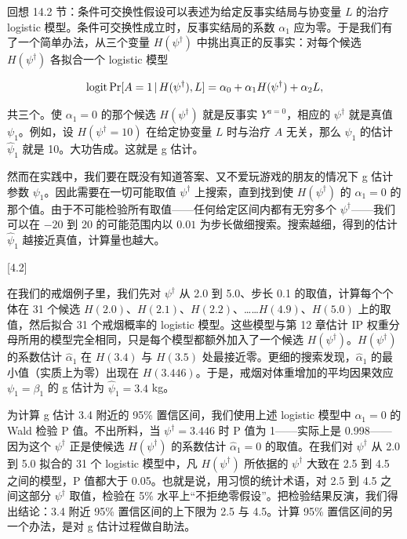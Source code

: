 回想 14.2 节：条件可交换性假设可以表述为给定反事实结局与协变量 $L$ 的治疗 logistic 模型。条件可交换性成立时，反事实结局的系数 $\alpha_1$ 应为零。于是我们有了一个简单办法，从三个变量 $H(\psi^\dagger)$ 中挑出真正的反事实：对每个候选 $H(\psi^\dagger)$ 各拟合一个 logistic 模型

\[
\operatorname{logit}\Pr[A=1\,|\, H(\psi^\dagger),L]=\alpha_0+\alpha_1H(\psi^\dagger)+\alpha_2L,
\]

共三个。使 $\alpha_1=0$ 的那个候选 $H(\psi^\dagger)$ 就是反事实 $Y^{a=0}$，相应的 $\psi^\dagger$ 就是真值 $\psi_1$。例如，设 $H(\psi^\dagger=10)$ 在给定协变量 $L$ 时与治疗 $A$ 无关，那么 $\psi_1$ 的估计 $\hat\psi_1$ 就是 10。大功告成。这就是 g 估计。

\marginnote{\textcolor{black!85}{Rosenbaum (1987) 针对不随时间变化的治疗提出了这一过程的一个版本。}\par\vspace{4pt}\textcolor{black!85}{要点：g 估计并不检验条件可交换性是否成立；它假定条件可交换性成立。}}

然而在实践中，我们要在既没有知道答案、又不爱玩游戏的朋友的情况下 g 估计参数 $\psi_1$。因此需要在一切可能取值 $\psi^\dagger$ 上搜索，直到找到使 $H(\psi^\dagger)$ 的 $\alpha_1=0$ 的那个值。由于不可能检验所有取值——任何给定区间内都有无穷多个 $\psi^\dagger$——我们可以在 $-20$ 到 $20$ 的可能范围内以 $0.01$ 为步长做细搜索。搜索越细，得到的估计 $\hat\psi_1$ 越接近真值，计算量也越大。

\marginnote{\textcolor{black!85}{代码：程序 14.2}}[4.2\baselineskip]

在我们的戒烟例子里，我们先对 $\psi^\dagger$ 从 2.0 到 5.0、步长 0.1 的取值，计算每个个体在 31 个候选 $H(2.0)$、$H(2.1)$、$H(2.2)$、……$H(4.9)$、$H(5.0)$ 上的取值，然后拟合 31 个戒烟概率的 logistic 模型。这些模型与第 12 章估计 IP 权重分母所用的模型完全相同，只是每个模型都额外加入了一个候选 $H(\psi^\dagger)$。$H(\psi^\dagger)$ 的系数估计 $\hat\alpha_1$ 在 $H(3.4)$ 与 $H(3.5)$ 处最接近零。更细的搜索发现，$\hat\alpha_1$ 的最小值（实质上为零）出现在 $H(3.446)$。于是，戒烟对体重增加的平均因果效应 $\psi_1=\beta_1$ 的 g 估计为 $\hat\psi_1=3.4$ kg。

为计算 g 估计 3.4 附近的 95\% 置信区间，我们使用上述 logistic 模型中 $\alpha_1=0$ 的 Wald 检验 P 值。不出所料，当 $\psi^\dagger=3.446$ 时 P 值为 1——实际上是 0.998——因为这个 $\psi^\dagger$ 正是使候选 $H(\psi^\dagger)$ 的系数估计 $\hat\alpha_1=0$ 的取值。在我们对 $\psi^\dagger$ 从 2.0 到 5.0 拟合的 31 个 logistic 模型中，凡 $H(\psi^\dagger)$ 所依据的 $\psi^\dagger$ 大致在 2.5 到 4.5 之间的模型，P 值都大于 0.05。也就是说，用习惯的统计术语，对 2.5 到 4.5 之间这部分 $\psi^\dagger$ 取值，检验在 5\% 水平上“不拒绝零假设”。把检验结果反演，我们得出结论：3.4 附近 95\% 置信区间的上下限为 2.5 与 4.5。计算 95\% 置信区间的另一个办法，是对 g 估计过程做自助法。

